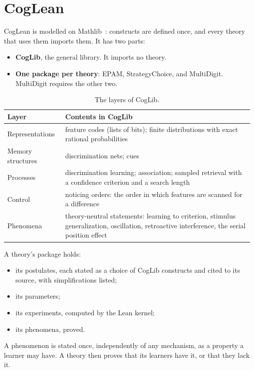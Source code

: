 \documentclass[11pt]{article}
\begin{document}
\section{CogLean}
\label{sec:coglean}

CogLean is modelled on Mathlib~\cite{mathlib2020}: constructs are defined once, and every theory that uses them imports them. It has two parts:
\begin{itemize}
  \item \textbf{CogLib}, the general library. It imports no theory.
  \item \textbf{One package per theory}: EPAM, StrategyChoice, and MultiDigit. MultiDigit requires the other two.
\end{itemize}

\begin{table}[h]
\centering
\begin{tabularx}{\linewidth}{@{}lX@{}}
\toprule
Layer & Contents in CogLib \\
\midrule
Representations & feature codes (lists of bits); finite distributions with exact rational probabilities \\
Memory structures & discrimination nets; cues \\
Processes & discrimination learning; association; sampled retrieval with a confidence criterion and a search length \\
Control & noticing orders: the order in which features are scanned for a difference \\
Phenomena & theory-neutral statements: learning to criterion, stimulus generalization, oscillation, retroactive interference, the serial position effect \\
\bottomrule
\end{tabularx}
\caption{The layers of CogLib.}
\end{table}

A theory's package holds:
\begin{itemize}
  \item its postulates, each stated as a choice of CogLib constructs and cited to its source, with simplifications listed;
  \item its parameters;
  \item its experiments, computed by the Lean kernel;
  \item its phenomena, proved.
\end{itemize}

A phenomenon is stated once, independently of any mechanism, as a property a learner may have. A theory then proves that its learners have it, or that they lack it.
\end{document}

